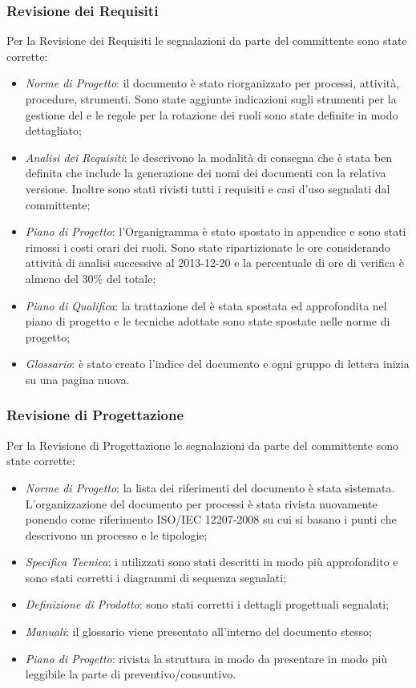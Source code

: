 		\subsubsection{Revisione dei Requisiti}
		Per la Revisione dei Requisiti le segnalazioni da parte del committente sono state corrette:
		
		\begin{itemize}
			\item \emph{Norme di Progetto}: il documento è stato riorganizzato per processi, attività, procedure, strumenti. Sono state aggiunte indicazioni sugli strumenti per la gestione del  e le regole per la rotazione dei ruoli sono state definite in modo dettagliato;
			\item \emph{Analisi dei Requisiti}: le \NormeDiProgetto{} descrivono la modalità di consegna che è stata ben definita che include la generazione dei nomi dei documenti con la relativa versione. Inoltre sono stati rivisti tutti i requisiti e casi d'uso segnalati dal committente;
			\item \emph{Piano di Progetto}: l'Organigramma è stato spostato in appendice e sono stati rimossi i costi orari dei ruoli. Sono state ripartizionate le ore considerando attività di analisi successive al 2013-12-20 e la percentuale di ore di verifica è almeno del 30\% del totale;
			\item \emph{Piano di Qualifica}: la trattazione del  è stata spostata ed approfondita nel piano di progetto e le tecniche adottate sono state spostate nelle norme di progetto;
			\item \emph{Glossario}: è stato creato l'indice del documento e ogni gruppo di lettera inizia su una pagina nuova.
		\end{itemize}
		
		\subsubsection{Revisione di Progettazione}

		Per la Revisione di Progettazione le segnalazioni da parte del committente sono state corrette:
		
		\begin{itemize}
			\item \emph{Norme di Progetto}: la lista dei riferimenti del documento è stata sistemata. L'organizzazione del documento per processi è stata rivista nuovamente ponendo come riferimento ISO/IEC 12207-2008 su cui si basano i punti che descrivono un processo e le tipologie;
			\item \emph{Specifica Tecnica}: i  utilizzati sono stati descritti in modo più approfondito e sono stati corretti i diagrammi di sequenza segnalati;
			\item \emph{Definizione di Prodotto}: sono stati corretti i dettagli progettuali segnalati;
			\item \emph{Manuali}: il glossario viene presentato all'interno del documento stesso;
			\item \emph{Piano di Progetto}: rivista la struttura in modo da presentare in modo più leggibile la parte di preventivo/consuntivo.
		\end{itemize}

